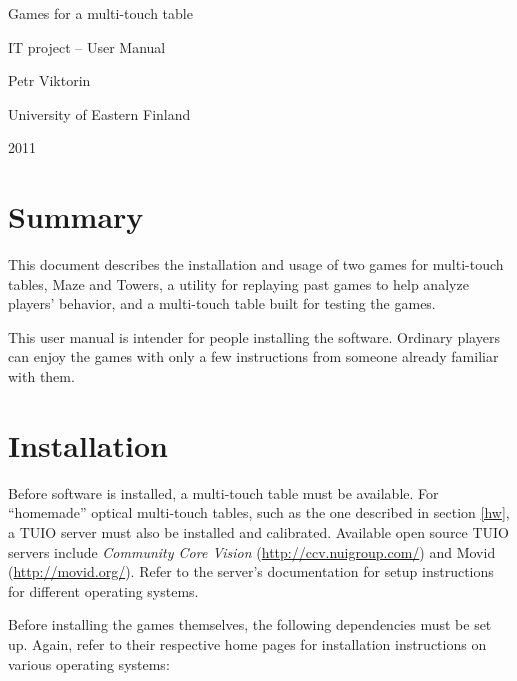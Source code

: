 \documentclass[a4paper,11pt]{article}
\begin{document}
\vspace*{3cm}

\begin{center}
{
    \huge Games for a multi-touch table

    \vspace{0.5em}

    \large IT project – User Manual
}

\vspace{3em}

Petr Viktorin

University of Eastern Finland

2011
\end{center}

\vspace*{2.718\fill}

\newpage

\tableofcontents

\newpage

\section{Summary}

This document describes the installation and usage of two games for
multi-touch tables, Maze and Towers, a utility for replaying past games to
help analyze players' behavior, and a multi-touch table built for testing the
games.

This user manual is intender for people installing the software.
Ordinary players can enjoy the games with only a few instructions from someone
already familiar with them.

\section{Installation}

Before software is installed, a multi-touch table must be available.
For “homemade” optical multi-touch tables, such as the one described in
section \ref{hw}, a TUIO server must also be installed and calibrated.
Available open source TUIO servers include \emph{Community Core Vision}
(\url{http://ccv.nuigroup.com/}) and
Movid (\url{http://movid.org/}).
Refer to the server's documentation for setup instructions for different
operating systems.

Before installing the games themselves, the following dependencies must be
set up.
Again, refer to their respective home pages for installation instructions
on various operating systems:
\end{document}
